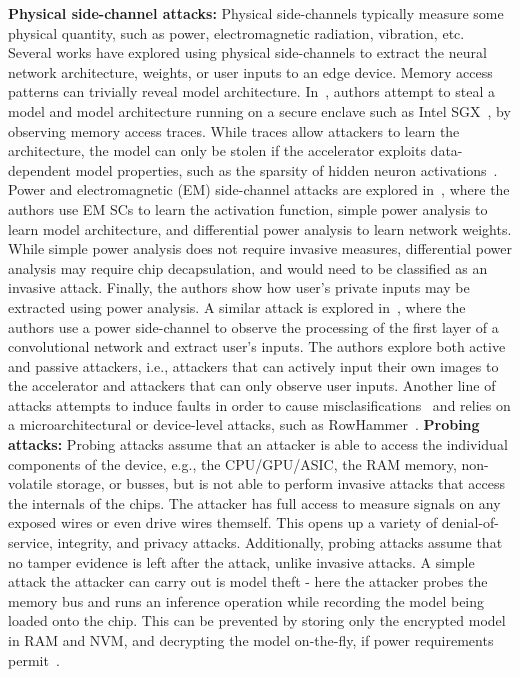 \noindent \textbf{Physical side-channel attacks:}
Physical side-channels typically measure some physical quantity, such as power, electromagnetic radiation, vibration, etc.
Several works have explored using physical side-channels to extract the neural network architecture, weights, or user inputs to an edge device.
Memory access patterns can trivially reveal model architecture. In~, authors attempt to steal a model and model architecture running on a secure enclave such as Intel SGX~, by observing memory access traces. While traces allow attackers to learn the architecture, the model can only be stolen if the accelerator exploits data-dependent model properties, such as the sparsity of hidden neuron activations~. Power and electromagnetic (EM) side-channel attacks are explored in~, where the authors use EM SCs to learn the activation function, simple power analysis to learn model architecture, and differential power analysis to learn network weights. While simple power analysis does not require invasive measures, differential power analysis may require chip decapsulation, and would need to be classified as an invasive attack. Finally, the authors show how user's private inputs may be extracted using power analysis.
A similar attack is explored in~, where the authors use a power side-channel to observe the processing of the first layer of a convolutional network and extract user's inputs. The authors explore both active and passive attackers, i.e., attackers that can actively input their own images to the accelerator and attackers that can only observe user inputs.
Another line of attacks attempts to induce faults in order to cause misclasifications~ and relies on a microarchitectural or device-level attacks, such as RowHammer~.
\noindent \textbf{Probing attacks:}
Probing attacks assume that an attacker is able to access the individual components of the device, e.g., the CPU/GPU/ASIC, the RAM memory, non-volatile storage, or busses, but is not able to perform invasive attacks that access the internals of the chips. The attacker has full access to measure signals on any exposed wires or even drive wires themself. This opens up a variety of denial-of-service, integrity, and privacy attacks. Additionally, probing attacks assume that no tamper evidence is left after the attack, unlike invasive attacks. 
A simple attack the attacker can carry out is model theft - here the attacker probes the memory bus and runs an inference operation while recording the model being loaded onto the chip. This can be prevented by storing only the encrypted model in RAM and NVM, and decrypting the model on-the-fly, if power requirements permit~. 
